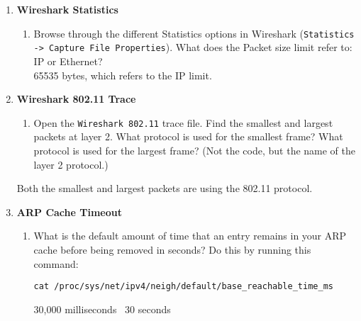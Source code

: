 \documentclass[12pt]{article}
\begin{document}
\begin{enumerate}[label=Q\arabic*:]
      \item \textbf{Wireshark Statistics}
            \begin{enumerate}[label=(\alph*)]
                  \item Browse through the different Statistics options in Wireshark (\texttt{Statistics -> Capture File Properties}). What does the Packet size limit refer to: IP or Ethernet? \\
                        65535 bytes, which refers to the IP limit.
            \end{enumerate}

      \item \textbf{Wireshark 802.11 Trace}
            \begin{enumerate}[label=(\alph*)]
                  \item Open the \texttt{Wireshark 802.11} trace file. Find the smallest and largest packets at layer 2. What protocol is used for the smallest frame? What protocol is used for the largest frame? (Not the code, but the name of the layer 2 protocol.)
            \end{enumerate}
            Both the smallest and largest packets are using the 802.11 protocol.
            \clearpage

      \item \textbf{ARP Cache Timeout}
            \begin{enumerate}[label=(\alph*)]
                  \item What is the default amount of time that an entry remains in your ARP cache before being removed in seconds?
                        Do this by running this command:
                        \begin{verbatim}
cat /proc/sys/net/ipv4/neigh/default/base_reachable_time_ms
        \end{verbatim}
                        30,000 milliseconds \textrightarrow\ 30 seconds
            \end{enumerate}


\end{enumerate}
\end{document}
